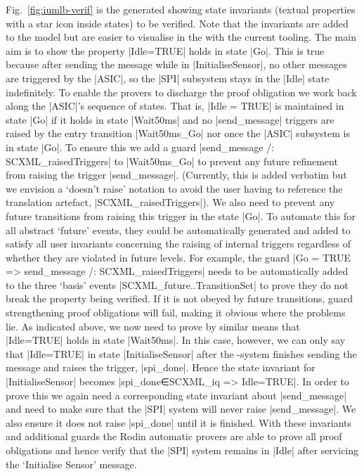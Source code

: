 Fig.~\ref{fig:iumlb-verif} is the generated \iUMLB showing state invariants (textual properties with a star icon inside states) to be verified. Note that the invariants are added to the \SCXML model but are easier to visualise in the \iUMLB with the current tooling.
The main aim is to show the property |Idle=TRUE| holds in state |Go|. 
This is true because after sending the message while in |InitialiseSensor|, no other messages are triggered by the |ASIC|, so the |SPI| subsystem stays in the |Idle| state indefinitely. 
To enable the provers to discharge the proof obligation we work back along the |ASIC|'s sequence of states. 
That is, |Idle = TRUE| is maintained in state |Go| if it holds in state |Wait50ms| and no |send_message| triggers are raised by the entry transition |Wait50ms_Go| nor once the |ASIC| subsystem is in state |Go|. 
To ensure this we add a guard |send_message /: SCXML_raisedTriggers| to |Wait50ms_Go| to prevent any future refinement from raising the trigger |send_message|.
(Currently, this is added verbatim but we envision a `doesn't raise' notation to avoid the user having to reference the translation artefact, |SCXML_raisedTriggers|).
We also need to prevent any future transitions from raising this trigger in the state |Go|.
To automate this for all abstract `future' events, they could be automatically generated and added to satisfy all user invariants concerning the raising of internal triggers regardless of whether they are violated in future levels. 
For example, the guard  |Go = TRUE => send_message /: SCXML_raisedTriggers| needs to be automatically added to the three `basis' events |SCXML_future..TransitionSet| to prove they do not break the property being verified. 
If it is not obeyed by future transitions, guard strengthening proof obligations will fail, making it obvious where the problems lie.
As indicated above, we now need to prove by similar means that |Idle=TRUE| holds in state |Wait50ms|. 
In this case, however, we can only say that |Idle=TRUE| in state |InitialiseSensor| after the \SPI-system finishes sending the message and raises the trigger, |spi_done|. 
Hence the state invariant for |InitialiseSensor| becomes |spi_done∈SCXML_iq => Idle=TRUE|. 
In order to prove this we again need a corresponding state invariant about |send_message| and need to make sure that the |SPI| system will never raise |send_message|.
We also ensure it does not raise |spi_done| until it is finished. 
With these invariants and additional guards the Rodin automatic provers are able to prove all proof obligations and hence verify that the |SPI| system remains in |Idle| after servicing the `Initialise Sensor' message.


